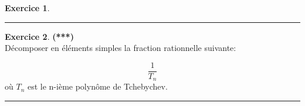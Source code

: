 \documentclass[a4paper,11pt]{article}
\theoremstyle{definition}
\newtheorem{exo}{Exercice} %
\begin{document}
\begin{minipage}{1\linewidth}
\begin{minipage}[t]{0.48\linewidth}
\begin{exo}
			
			\centering
			\rule{1\linewidth}{0.6pt}
		\end{exo}
		
		\begin{exo}\textbf{(***)}\quad\\[0.2cm]
				Décomposer en éléments simples la fraction rationnelle suivante:
				
				$$\dfrac{1}{T_n}$$
				où $T_n$ est le n-ième polynôme de Tchebychev.
			 \centering\rule{1\linewidth}{0.6pt}\end{exo}
		
		
	\end{minipage}
\end{minipage}

	
\end{document}
